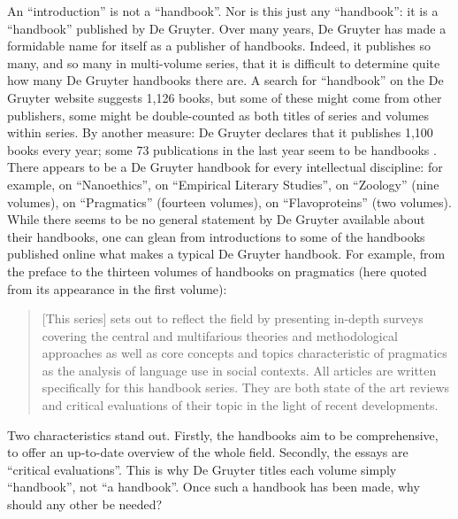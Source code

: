 \begin{review}
An ``introduction'' is not a ``handbook''. Nor is this just any
``handbook'': it is a ``handbook'' published by De Gruyter. Over many
years, De Gruyter has made a formidable name for itself as a publisher
of handbooks. Indeed, it publishes so many, and so many in multi-volume
series, that it is difficult to determine quite how many De Gruyter
handbooks there are. A search for ``handbook'' on the De Gruyter website
suggests 1,126 books, but some of these might come from other
publishers, some might be double-counted as both titles of series and
volumes within series. By another measure: De Gruyter declares that it
publishes 1,100 books every year; some 73 publications in the last year
seem to be handbooks \parencite{noauthor_publication_2022}. There appears to be a De Gruyter
handbook for every intellectual discipline: for example, on
``Nanoethics'', on ``Empirical Literary Studies'', on ``Zoology'' (nine
volumes), on ``Pragmatics'' (fourteen volumes), on ``Flavoproteins''
(two volumes). While there seems to be no general statement by De
Gruyter available about their handbooks, one can glean from
introductions to some of the handbooks published online what makes a
typical De Gruyter handbook. For example, from the preface to the
thirteen volumes of handbooks on pragmatics (here quoted from its
appearance in the first volume):

\begin{quote}
{[}This series{]} sets out to reflect the field by presenting in-depth
surveys covering the central and multifarious theories and
methodological approaches as well as core concepts and topics
characteristic of pragmatics as the analysis of language use in social
contexts. All articles are written specifically for this handbook
series. They are both state of the art reviews and critical evaluations
of their topic in the light of recent developments.

\begin{flushright}
    \parencite[v]{bublitz_foundations_2011}
\end{flushright}
\end{quote}

\noindent Two characteristics stand out. Firstly, the handbooks aim to be
comprehensive, to offer an up-to-date overview of the whole field.
Secondly, the essays are ``critical evaluations''. This is why De
Gruyter titles each volume simply ``handbook'', not ``a handbook''. Once
such a handbook has been made, why should any other be needed?


\end{review}
